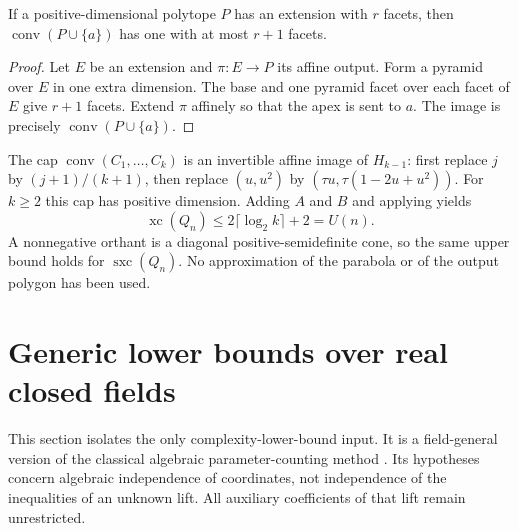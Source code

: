 \documentclass[11pt,a4paper]{article}
\numberwithin{equation}{section}
\theoremstyle{plain}
\newcommand{\conv}{\operatorname{conv}}
\newcommand{\xc}{\operatorname{xc}}
\newcommand{\sx}{\operatorname{sxc}}
\begin{document}
\begin{lemma}\label{poly:ic:lem:addpoint}
If a positive-dimensional polytope $P$ has an extension with $r$ facets,
then $\conv(P\cup\{a\})$ has one with at most $r+1$ facets.
\end{lemma}
\begin{proof}
Let $E$ be an extension and $\pi:E\to P$ its affine output. Form a pyramid
over $E$ in one extra dimension. The base and one pyramid facet over each
facet of $E$ give $r+1$ facets. Extend $\pi$ affinely so that the apex is
sent to $a$. The image is precisely $\conv(P\cup\{a\})$.
\end{proof}

The cap $\conv(C_1,\ldots,C_k)$ is an invertible affine image of
$H_{k-1}$: first replace $j$ by $(j+1)/(k+1)$, then replace
$(u,u^2)$ by $(\tau u,\tau(1-2u+u^2))$. For $k\geq2$ this cap has
positive dimension. Adding $A$ and $B$ and applying
 yields
\[
 \xc(Q_n)\leq2\lceil\log_2k\rceil+2=U(n).
\]
A nonnegative orthant is a diagonal positive-semidefinite cone, so the
same upper bound holds for $\sx(Q_n)$. No approximation of the parabola
or of the output polygon has been used.

\section{Generic lower bounds over real closed fields}\label{poly:ic:sec:generic}

This section isolates the only complexity-lower-bound input. It is a
field-general version of the classical algebraic parameter-counting
method \cite{ic:frt,ic:grt}. Its hypotheses concern algebraic independence of
coordinates, not independence of the inequalities of an unknown lift.
All auxiliary coefficients of that lift remain unrestricted.
\end{document}
